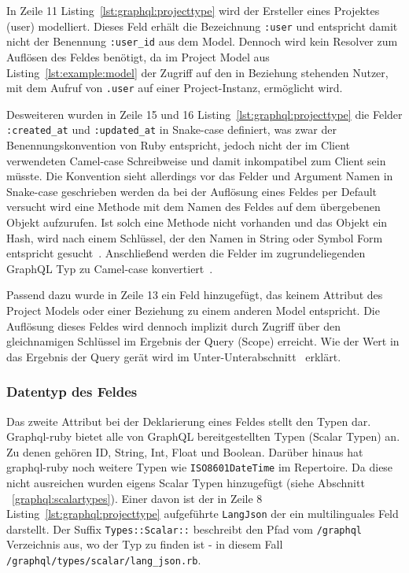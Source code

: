 In Zeile 11 Listing~\ref{lst:graphql:projecttype} wird der Ersteller eines Projektes (user) modelliert. Dieses Feld erhält die Bezeichnung \lstinline|:user| und entspricht damit nicht der Benennung \lstinline|:user_id| aus dem Model. Dennoch wird kein Resolver zum Auflösen des Feldes benötigt, da im Project Model aus Listing~\ref{lst:example:model} der Zugriff auf den in Beziehung stehenden Nutzer, mit dem Aufruf von \lstinline|.user| auf einer Project-Instanz, ermöglicht wird. 

Desweiteren wurden in Zeile 15 und 16 Listing~\ref{lst:graphql:projecttype} die Felder \lstinline|:created_at| und \lstinline|:updated_at| in Snake-case definiert, was zwar der Benennungskonvention von Ruby entspricht, jedoch nicht der im Client verwendeten Camel-case Schreibweise und damit inkompatibel zum Client sein müsste. Die Konvention sieht allerdings vor das Felder und Argument Namen in Snake-case geschrieben werden da bei der Auflösung eines Feldes per Default versucht wird eine Methode mit dem Namen des Feldes auf dem übergebenen Objekt aufzurufen.
Ist solch eine Methode nicht vorhanden und das Objekt ein Hash, wird nach einem Schlüssel, der den Namen in String oder Symbol Form entspricht gesucht~\cite{graphql-field-resolution}. Anschließend werden die Felder im zugrundeliegenden GraphQL Typ zu Camel-case konvertiert~\cite{graphql-object-classes}.

Passend dazu wurde in Zeile 13 ein Feld hinzugefügt, das keinem Attribut des Project Models oder einer Beziehung zu einem anderen Model entspricht. Die Auflösung dieses Feldes wird dennoch implizit durch Zugriff über den gleichnamigen Schlüssel im Ergebnis der Query (Scope) erreicht. Wie der Wert in das Ergebnis der Query gerät wird im Unter-Unterabschnitt~ erklärt.

\subsubsection{Datentyp des Feldes}
Das zweite Attribut bei der Deklarierung eines Feldes stellt den Typen dar. Graphql-ruby bietet alle von GraphQL bereitgestellten Typen (Scalar Typen) an. Zu denen gehören ID, String, Int, Float und Boolean. Darüber hinaus hat graphql-ruby noch weitere Typen wie \lstinline|ISO8601DateTime| im Repertoire. Da diese nicht ausreichen wurden eigens Scalar Typen hinzugefügt (siehe Abschnitt ~\ref{graphql:scalartypes}). Einer davon ist der in Zeile 8 Listing~\ref{lst:graphql:projecttype} aufgeführte \lstinline|LangJson| der ein multilinguales Feld darstellt. Der Suffix \lstinline|Types::Scalar::| beschreibt den Pfad vom \lstinline|/graphql| Verzeichnis aus, wo der Typ zu finden ist - in diesem Fall \lstinline|/graphql/types/scalar/lang_json.rb|.

